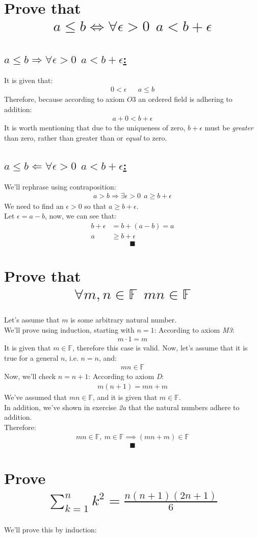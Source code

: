 \documentclass[a4paper, 12pt]{article}
\newcommand{\sub}[1]{\subsection{\underline{#1}}}
\newcommand{\?}{\stackrel{?}{=}}
\newcommand{\F}{\ensuremath{\mathbb{F}}}
\newcommand{\eq}[1]{\begin{align*}#1\end{align*}}
\renewcommand{\qed}{$$\blacksquare$$}
\begin{document}
\begin{titlepage}
\end{titlepage}

\section{Prove that \eq{a\leq{b} \iff \forall\epsilon>0~~a<b+\epsilon}}
\sub{$ a\leq{b} \Rightarrow \forall\epsilon>0~~a<b+\epsilon $:}
It is given that: \eq{0<\epsilon && a\leq{b}}
Therefore, because according to axiom $O3$ an ordered field is adhering to addition:
\eq{a+0<b+\epsilon}
It is worth mentioning that due to the uniqueness of zero, $b+\epsilon$ must be \textit{greater} than zero, rather than greater than or \textit{equal} to zero.
\sub{$ a\leq{b} \Leftarrow \forall\epsilon>0~~a<b+\epsilon $:}
We'll rephrase using contraposition: \eq{a>b \Rightarrow \exists\epsilon>0~~a\geq{b+\epsilon}}
We need to find an $\epsilon>0$ so that $a\geq{b+\epsilon}$.\\
Let $\epsilon=a-b$, now, we can see that:
\eq{
    b+\epsilon &= b+(a-b) = a\\
    a&\geq{b+\epsilon}
}
\qed

\section{Prove that \eq{\forall{m,n}\in{\F}~~mn\in{\F}}}
Let's assume that $m$ is some arbitrary natural number.\\
We'll prove using induction, starting with $n=1$:
According to axiom \textit{M3}:
\eq{m\cdot{1}=m}
It is given that $m\in{\F}$, therefore this case is valid.
Now, let's assume that it is true for a general $n$, i.e. $n=n$, and:
\eq{mn\in{\F}}
Now, we'll check $n=n+1$:
According to axiom \textit{D}:
\eq{ m(n+1)=mn+m }
We've assumed that $mn\in{\F}$, and it is given that $m\in{\F}$.\\
In addition, we've shown in exercise \textit{2a} that the natural numbers adhere to addition.\\
Therefore: \eq{mn\in{\F},~m\in{\F}\implies(mn+m)\in{\F}}
\qed

\section{Prove \eq{\sum^{n}_{k=1}k^{2}=\frac{n(n+1)(2n+1)}{6}}}
We'll prove this by induction:


\end{document}
